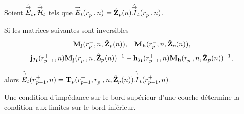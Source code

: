     \begin{prop}%
      \label{prop:sphere:transfert:impedance}

      Soient \(\hat{{\overset{\rightarrow}{E}}}_t,\hat{{\overset{\rightarrow}{\mathcal{H}}}}_t\) tels que \({\overset{\rightarrow}{E}}_t(r_{p}^-,n) = \hat{\mathbf{Z}}_{p}(n)\hat{{\overset{\rightarrow}{J}}}_t(r_{p}^-,n)\).

      Si les matrices suivantes sont inversibles
      \begin{align*}
        \mathbf{M}_{\mathbf{j}}(r_p^-,n,\hat{\mathbf{Z}}_{p}(n)), && \mathbf{M}_{\mathbf{h}}(r_p^-,n,\hat{\mathbf{Z}}_{p}(n)),
      \end{align*}
      \begin{align*}
        \mathbf{j}_{\mathcal{H}}(r_{p-1}^+,n)\mathbf{M}_{\mathbf{j}}(r_{p}^-,n,\hat{\mathbf{Z}}_{p}(n))^{-1} - \mathbf{h}_{\mathcal{H}}(r_{p-1}^+,n)\mathbf{M}_{\mathbf{h}}(r_{p}^-,n,\hat{\mathbf{Z}}_{p}(n))^{-1},
      \end{align*}

      alors \(\hat{{\overset{\rightarrow}{E}}}_t(r_{p-1}^+,n) = \mathbf{T}_p(r_{p-1}^+,r_{p}^-,n,\hat{\mathbf{Z}}_{p}(n))\hat{{\overset{\rightarrow}{J}}}_t(r_{p-1}^+,n)\).

      Une condition d'impédance sur le bord supérieur d'une couche détermine la condition aux limites sur le bord inférieur.
    \end{prop}


